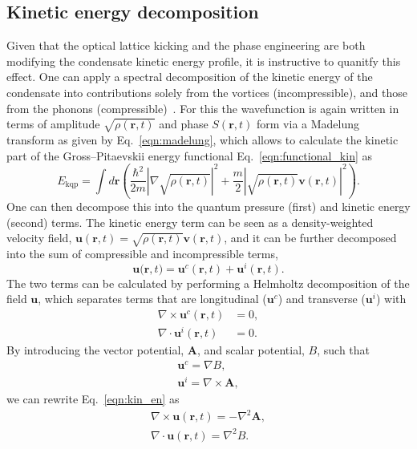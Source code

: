 \subsection{Kinetic energy decomposition}\label{sec:kinspec}
Given that the optical lattice kicking and the phase engineering are both modifying the condensate kinetic energy profile, it is instructive to quanitfy this effect. One can apply a spectral decomposition of the kinetic energy of the condensate into contributions solely from the vortices (incompressible), and those from the phonons (compressible)~\cite{CT:Nore_prl_1997,CT:Nore_pof_1997,CT:Bradley_prx_2012}. For this the wavefunction is again written in terms of amplitude $\sqrt{\rho(\mathbf{r},t)}$ and phase $S(\mathbf{r},t)$ form via a Madelung transform as given by Eq.~\eqref{eqn:madelung}, which allows to calculate the kinetic part of the Gross--Pitaevskii energy functional Eq.~\eqref{eqn:functional_kin} as
\begin{equation}
    E_{\text{kqp}} = \int d\mathbf{r} \left( \frac{\hbar^2}{2m}| \nabla\sqrt{\rho(\mathbf{r},t)} |^2  + \frac{m}{2}|\sqrt{\rho(\mathbf{r},t)}\mathbf{v}(\mathbf{r},t) |^2\right).
\end{equation}
One can then decompose this into the quantum pressure (first) and kinetic energy (second) terms. The kinetic energy term can be seen as a density-weighted velocity field, $\mathbf{u}(\mathbf{r},t) = \sqrt{\rho(\mathbf{r},t)}\mathbf{v}(\mathbf{r},t)$, and it can be further decomposed into the sum of compressible and incompressible terms,
\begin{equation}\label{eqn:kin_en}
    \mathbf{u(r},t) = \mathbf{u}^c(\mathbf{r},t) + \mathbf{u}^i(\mathbf{r},t).
\end{equation}
The two terms can be calculated by performing a Helmholtz decomposition of the field $\mathbf{u}$, which separates terms that are longitudinal ($\mathbf{u}^c$) and transverse ($\mathbf{u}^i$) with
\begin{subequations}\label{eqn:kinterms}
\begin{align}
    \nabla \times \mathbf{u}^c(\mathbf{r},t) &= 0, \\
    \nabla \cdot \mathbf{u}^i(\mathbf{r},t) &= 0.
\end{align}
\end{subequations}
By introducing the vector potential, $\mathbf{A}$, and scalar potential, $B$, such that
\begin{subequations}
\begin{align}
    \mathbf{u}^c = \nabla B, \\
    \mathbf{u}^i = \nabla \times \mathbf{A},
\end{align}
\end{subequations}
we can rewrite Eq.~\eqref{eqn:kin_en} as
\begin{align}
    \nabla \times \mathbf{u}(\mathbf{r},t) = -\nabla^2 \mathbf{A}, \\
    \nabla \cdot \mathbf{u}(\mathbf{r},t) = \nabla^2 {B}.
\end{align}

